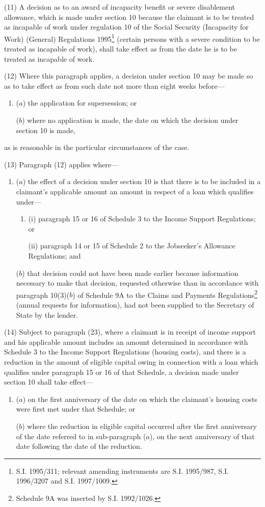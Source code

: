 \documentclass[12pt,a4paper]{article}
\begin{document}
(11) A decision as to an award of incapacity benefit or severe disablement allowance, which is made under section 10 because the claimant is to be treated as incapable of work under regulation 10 of the Social Security (Incapacity for Work) (General) Regulations 1995\footnote{\frenchspacing S.I. 1995/311; relevant amending instruments are S.I. 1995/987, S.I. 1996/3207 and S.I. 1997/1009.} (certain persons with a severe condition to be treated as incapable of work), shall take effect as from the date he is to be treated as incapable of work.

(12) Where this paragraph applies, a decision under section 10 may be made so as to take effect as from such date not more than eight weeks before—
\begin{enumerate}\item[]
($a$) the application for supersession; or

($b$) where no application is made, the date on which the decision under section 10 is made,
\end{enumerate}
as is reasonable in the particular circumstances of the case.

(13) Paragraph (12) applies where—
\begin{enumerate}\item[]
($a$) the effect of a decision under section 10 is that there is to be included in a claimant’s applicable amount an amount in respect of a loan which qualifies under—
\begin{enumerate}\item[]
(i) paragraph 15 or 16 of Schedule 3 to the Income Support Regulations; or

(ii) paragraph 14 or 15 of Schedule 2 to the Jobseeker’s Allowance Regulations; and
\end{enumerate}

($b$) that decision could not have been made earlier because information necessary to make that decision, requested otherwise than in accordance with paragraph 10(3)($b$) of Schedule 9A to the Claims and Payments Regulations\footnote{\frenchspacing Schedule 9A was inserted by S.I. 1992/1026.} (annual requests for information), had not been supplied to the Secretary of State by the lender.
\end{enumerate}

(14) Subject to paragraph (23), where a claimant is in receipt of income support and his applicable amount includes an amount determined in accordance with Schedule 3 to the Income Support Regulations (housing costs), and there is a reduction in the amount of eligible capital owing in connection with a loan which qualifies under paragraph 15 or 16 of that Schedule, a decision made under section 10 shall take effect—
\begin{enumerate}\item[]
($a$) on the first anniversary of the date on which the claimant’s housing costs were first met under that Schedule; or

($b$) where the reduction in eligible capital occurred after the first anniversary of the date referred to in sub-paragraph ($a$), on the next anniversary of that date following the date of the reduction.
\end{enumerate}
\end{document}
